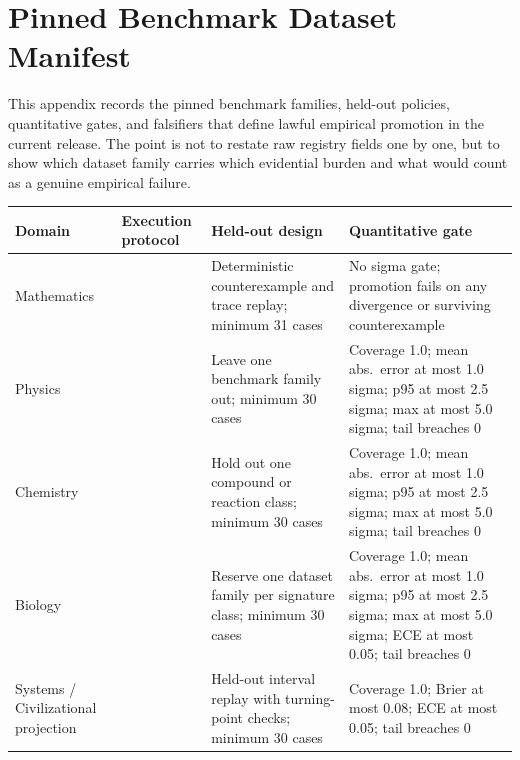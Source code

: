 \section{Pinned Benchmark Dataset Manifest}
\label{sec:oc-core-1-3-domain-benchmark-manifest}

This appendix records the pinned benchmark families, held-out policies,
quantitative gates, and falsifiers that define lawful empirical promotion in
the current release. The point is not to restate raw registry fields one by
one, but to show which dataset family carries which evidential burden and what
would count as a genuine empirical failure.

\begingroup
\footnotesize
\RaggedRight
\setlength{\tabcolsep}{4pt}
\setlength{\LTleft}{0pt}
\setlength{\LTright}{0pt}

\begin{table}[htbp]
\centering
\begin{tabular}{@{}L{0.16\textwidth}L{0.24\textwidth}L{0.27\textwidth}L{0.25\textwidth}@{}}
\toprule
Domain & Execution protocol & Held-out design & Quantitative gate \\
\midrule
Mathematics &  & Deterministic counterexample and trace replay; minimum 31 cases & No sigma gate; promotion fails on any divergence or surviving counterexample \\
Physics &  & Leave one benchmark family out; minimum 30 cases & Coverage 1.0; mean abs.\ error at most 1.0 sigma; p95 at most 2.5 sigma; max at most 5.0 sigma; tail breaches 0 \\
Chemistry &  & Hold out one compound or reaction class; minimum 30 cases & Coverage 1.0; mean abs.\ error at most 1.0 sigma; p95 at most 2.5 sigma; max at most 5.0 sigma; tail breaches 0 \\
Biology &  & Reserve one dataset family per signature class; minimum 30 cases & Coverage 1.0; mean abs.\ error at most 1.0 sigma; p95 at most 2.5 sigma; max at most 5.0 sigma; ECE at most 0.05; tail breaches 0 \\
Systems / Civilizational projection &  & Held-out interval replay with turning-point checks; minimum 30 cases & Coverage 1.0; Brier at most 0.08; ECE at most 0.05; tail breaches 0 \\
\bottomrule
\end{tabular}
\end{table}

